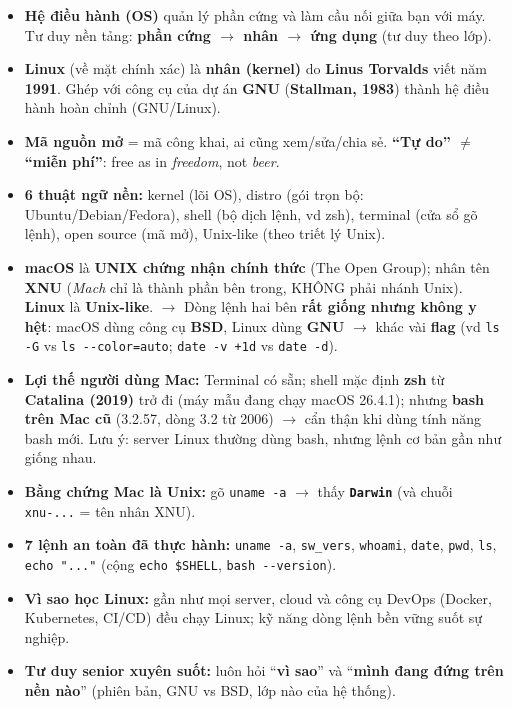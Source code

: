\documentclass[12pt,a4paper]{article}
\begin{document}
\begin{itemize}[leftmargin=*]
  \item \textbf{Hệ điều hành (OS)} quản lý phần cứng và làm cầu nối giữa bạn với máy. Tư duy nền tảng: \textbf{phần cứng $\rightarrow$ nhân $\rightarrow$ ứng dụng} (tư duy theo lớp).
  \item \textbf{Linux} (về mặt chính xác) là \textbf{nhân (kernel)} do \textbf{Linus Torvalds} viết năm \textbf{1991}. Ghép với công cụ của dự án \textbf{GNU} (\textbf{Stallman, 1983}) thành hệ điều hành hoàn chỉnh (GNU/Linux).
  \item \textbf{Mã nguồn mở} = mã công khai, ai cũng xem/sửa/chia sẻ. \textbf{``Tự do'' $\neq$ ``miễn phí''}: free as in \textit{freedom}, not \textit{beer}.
  \item \textbf{6 thuật ngữ nền:} kernel (lõi OS), distro (gói trọn bộ: Ubuntu/Debian/Fedora), shell (bộ dịch lệnh, vd zsh), terminal (cửa sổ gõ lệnh), open source (mã mở), Unix-like (theo triết lý Unix).
  \item \textbf{macOS} là \textbf{UNIX chứng nhận chính thức} (The Open Group); nhân tên \textbf{XNU} (\textit{Mach} chỉ là thành phần bên trong, KHÔNG phải nhánh Unix). \textbf{Linux} là \textbf{Unix-like}. $\rightarrow$ Dòng lệnh hai bên \textbf{rất giống nhưng không y hệt}: macOS dùng công cụ \textbf{BSD}, Linux dùng \textbf{GNU} $\rightarrow$ khác vài \textbf{flag} (vd \texttt{ls -G} vs \texttt{ls -{}-color=auto}; \texttt{date -v +1d} vs \texttt{date -d}).
  \item \textbf{Lợi thế người dùng Mac:} Terminal có sẵn; shell mặc định \textbf{zsh} từ \textbf{Catalina (2019)} trở đi (máy mẫu đang chạy macOS 26.4.1); nhưng \textbf{bash trên Mac cũ} (3.2.57, dòng 3.2 từ 2006) $\rightarrow$ cẩn thận khi dùng tính năng bash mới. Lưu ý: server Linux thường dùng bash, nhưng lệnh cơ bản gần như giống nhau.
  \item \textbf{Bằng chứng Mac là Unix:} gõ \texttt{uname -a} $\rightarrow$ thấy \textbf{\texttt{Darwin}} (và chuỗi \texttt{xnu-...} = tên nhân XNU).
  \item \textbf{7 lệnh an toàn đã thực hành:} \texttt{uname -a}, \texttt{sw\_vers}, \texttt{whoami}, \texttt{date}, \texttt{pwd}, \texttt{ls}, \texttt{echo "..."} (cộng \texttt{echo \$SHELL}, \texttt{bash -{}-version}).
  \item \textbf{Vì sao học Linux:} gần như mọi server, cloud và công cụ DevOps (Docker, Kubernetes, CI/CD) đều chạy Linux; kỹ năng dòng lệnh bền vững suốt sự nghiệp.
  \item \textbf{Tư duy senior xuyên suốt:} luôn hỏi ``\textbf{vì sao}'' và ``\textbf{mình đang đứng trên nền nào}'' (phiên bản, GNU vs BSD, lớp nào của hệ thống).
\end{itemize}
\end{document}
